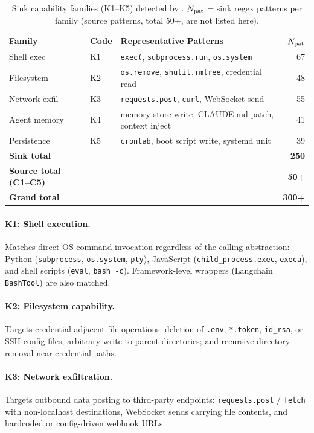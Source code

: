 \begin{table}[t]
\centering
\caption{Sink capability families (K1--K5) detected by \lscps.
  $N_{\rm pat}$ = sink regex patterns per family
  (source patterns, total 50+, are not listed here).}
\label{tab:sink_families}
\setlength{\tabcolsep}{4pt}
\small
\begin{tabular}{lllr}
\toprule
\textbf{Family} & \textbf{Code} & \textbf{Representative Patterns} & $N_{\rm pat}$\\
\midrule
Shell exec     & K1 & \texttt{exec(}, \texttt{subprocess.run}, \texttt{os.system} & 67 \\
Filesystem     & K2 & \texttt{os.remove}, \texttt{shutil.rmtree}, credential read & 48 \\
Network exfil  & K3 & \texttt{requests.post}, \texttt{curl}, WebSocket send & 55 \\
Agent memory   & K4 & memory-store write, CLAUDE.md patch, context inject & 41 \\
Persistence    & K5 & \texttt{crontab}, boot script write, systemd unit & 39 \\
\midrule
\textbf{Sink total} & & & \textbf{250} \\
\textbf{Source total (C1--C5)} & & & \textbf{50+} \\
\textbf{Grand total} & & & \textbf{300+} \\
\bottomrule
\end{tabular}
\end{table}

\paragraph{K1: Shell execution.}
Matches direct OS command invocation regardless of the calling abstraction:
Python (\texttt{subprocess}, \texttt{os.system}, \texttt{pty}),
JavaScript (\texttt{child\_process.exec}, \texttt{execa}),
and shell scripts (\texttt{eval}, \texttt{bash -c}).
Framework-level wrappers (\eg Langchain \texttt{BashTool}) are also matched.

\paragraph{K2: Filesystem capability.}
Targets credential-adjacent file operations: deletion of
\texttt{.env}, \texttt{*.token}, \texttt{id\_rsa},
or SSH config files; arbitrary write to parent directories;
and recursive directory removal near credential paths.

\paragraph{K3: Network exfiltration.}
Targets outbound data posting to third-party endpoints:
\texttt{requests.post} / \texttt{fetch} with non-localhost destinations,
WebSocket sends carrying file contents, and
hardcoded or config-driven webhook URLs.

